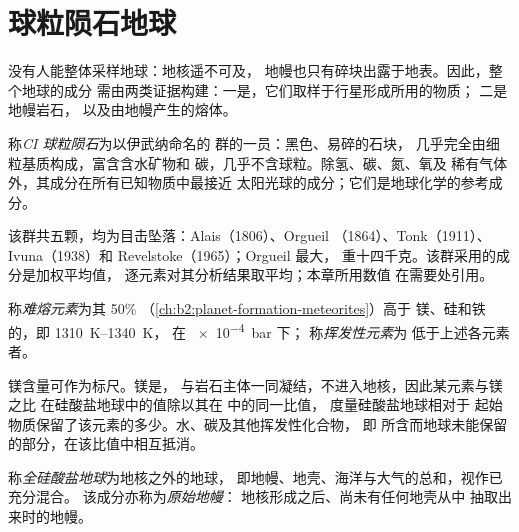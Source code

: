 \section{球粒陨石地球}

没有人能整体采样地球：地核遥不可及，
地幔也只有碎块出露于地表。因此，整个地球的成分
需由两类证据构建：一是，它们取样于行星形成所用的物质；
二是地幔岩石，
以及由地幔产生的熔体。

\begin{definition}[CI 球粒陨石]\label{def:b2:elements-in-the-earth:ci}
称\emph{CI 球粒陨石}为以伊武纳命名的
群的一员：黑色、易碎的石块，
几乎完全由细粒基质构成，富含含水矿物和
碳，几乎不含球粒。除氢、碳、氮、氧及
稀有气体外，其成分在所有已知物质中最接近
太阳光球的成分；它们是地球化学的参考成分。
\end{definition}

该群共五颗，均为目击坠落：Alais（1806）、Orgueil
（1864）、Tonk（1911）、Ivuna（1938）和 Revelstoke（1965）；Orgueil 最大，
重十四千克。该群采用的成分是加权平均值，
逐元素对其分析结果取平均；本章所用数值
在需要处引用。

\begin{definition}[难熔元素与挥发性元素]
\label{def:b2:elements-in-the-earth:volatility}
称\emph{难熔元素}为其 50\% 
（\cref{ch:b2:planet-formation-meteorites}）高于
镁、硅和铁的，即 \qtyrange{1310}{1340}{K}，
在 \qty{e-4}{bar} 下；
称\emph{挥发性元素}为
低于上述各元素者。
\end{definition}

镁含量可作为标尺。镁是，
与岩石主体一同凝结，不进入地核，因此某元素与镁之比
在硅酸盐地球中的值除以其在 中的同一比值，
度量硅酸盐地球相对于
起始物质保留了该元素的多少。水、碳及其他挥发性化合物，
即 所含而地球未能保留的部分，在该比值中相互抵消。

\begin{definition}
\label{def:b2:elements-in-the-earth:bse}
称\emph{全硅酸盐地球}为地核之外的地球，
即地幔、地壳、海洋与大气的总和，视作已充分混合。
该成分亦称为\emph{原始地幔}：
地核形成之后、尚未有任何地壳从中
抽取出来时的地幔。
\end{definition}

